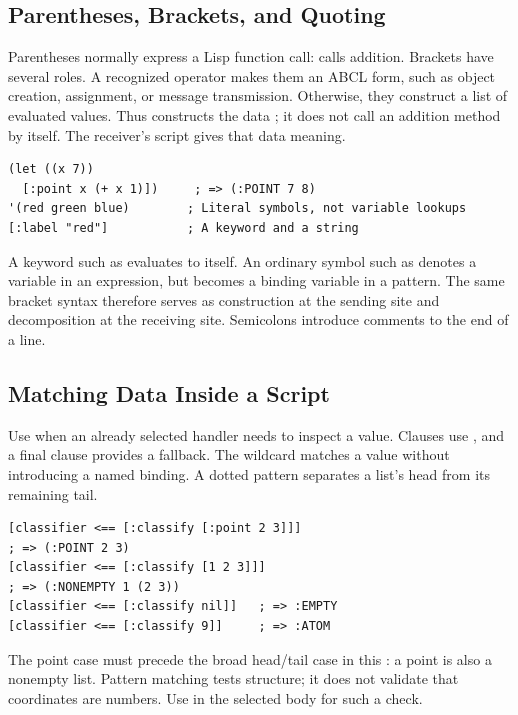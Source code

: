 \subsection{Parentheses, Brackets, and Quoting}

Parentheses normally express a Lisp function call:
 calls addition. Brackets have several roles.
A recognized operator makes them an ABCL form, such as object creation,
assignment, or message transmission. Otherwise, they construct a list
of evaluated values. Thus \code{[:add 2 3]} constructs the data
; it does not call an addition method by itself.
The receiver's script gives that data meaning.

\begin{lstlisting}
(let ((x 7))
  [:point x (+ x 1)])     ; => (:POINT 7 8)
'(red green blue)        ; Literal symbols, not variable lookups
[:label "red"]           ; A keyword and a string
\end{lstlisting}

A keyword such as  evaluates to itself. An ordinary symbol
such as  denotes a variable in an expression, but becomes a
binding variable in a pattern. The same bracket syntax therefore serves
as construction at the sending site and decomposition at the receiving site.
Semicolons introduce comments to the end of a line.

\subsection{Matching Data Inside a Script}

Use  when an already selected handler needs to inspect a value.
Clauses use , and a final  clause provides a fallback.
The wildcard \code{\_} matches a value without introducing a named binding.
A dotted pattern separates a list's head from its remaining tail.


\begin{lstlisting}
[classifier <== [:classify [:point 2 3]]]
; => (:POINT 2 3)
[classifier <== [:classify [1 2 3]]]
; => (:NONEMPTY 1 (2 3))
[classifier <== [:classify nil]]   ; => :EMPTY
[classifier <== [:classify 9]]     ; => :ATOM
\end{lstlisting}

The point case must precede the broad head/tail case in this :
a point is also a nonempty list. Pattern matching tests structure;
it does not validate that coordinates are numbers. Use  in
the selected body for such a check.

